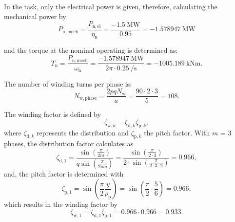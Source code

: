\begin{solutionblock}
    In the task, only the electrical power is given, therefore, calculating the mechanical power by
    $$ P_{\mathrm{n,mech}} = \frac{P_{\mathrm{n,el}}}{\eta_{\mathrm{n}}} = \frac{\SI{-1.5}{\mega\watt}}{0.95} = \SI{-1.578947}{\mega\watt}$$
    
    and the torque at the nominal operating is determined as:
    $$ T_{\mathrm{n}} = \frac{P_{\mathrm{n,mech}}}{\omega_{\mathrm{n}}} = \frac{\SI{-1.578947}{\mega\watt}}{2\pi \cdot \SI{0.25}{\per\second}} = \SI{-1005.189}{\kilo\newton\metre}.$$
\end{solutionblock}


\begin{solutionblock}
    The number of winding turns per phase is: 
    $$
    N_{\mathrm{w,phase}} = \frac{2p q N_{\mathrm{w}}}{a} = \frac{90 \cdot 2 \cdot 3}{5} = 108.
    $$
\end{solutionblock}



\begin{solutionblock}
    The winding factor is defined by
    $$ \zeta_{\mathrm{w,}k} = \zeta_{\mathrm{d,}k} \zeta_{\mathrm{p,}k}, $$
    where $\zeta_{\mathrm{d,}k}$ represents the distribution and $\zeta_{\mathrm{p,}k}$ the pitch factor.
    With $m$ = 3 phases, the distribution factor calculates as
    $$\zeta_{\mathrm{d,}1} = \frac{\sin\left(\frac{\pi}{2m} \right)}{q\sin\left(\frac{\pi}{2mq} \right)} 
    = \frac{\sin\left(\frac{\pi}{2\cdot3}\right)}{2 \cdot \sin\left(\frac{\pi}{2\cdot3\cdot 2} \right)}
    = 0.966,
    $$
    and, the pitch factor is determined with
    $$
    \zeta_{\mathrm{p,}1} = \sin\left(\frac{\pi}{2} \frac{y}{\rho_{\mathrm{p}}}\right)
    = \sin\left(\frac{\pi}{2} \cdot \frac{5}{6} \right) = 0.966,
    $$
    which results in the winding factor by
    $$ \zeta_{\mathrm{w,}1} =  \zeta_{\mathrm{d,}1}  \zeta_{\mathrm{p,}1} = 0.966 \cdot 0.966 = 0.933. $$
    
\end{solutionblock}


